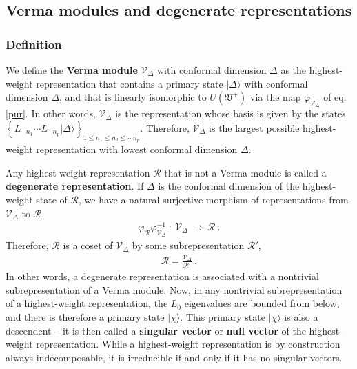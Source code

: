 \documentclass[12pt, a4paper, notitlepage, twoside]{report}
\numberwithin{equation}{section}
\theoremstyle{break}
\begin{document}
\subsection{Verma modules and degenerate representations \label{secvm}}

\subsubsection{Definition}

We define the \textbf{\boldmath Verma module} $\mathcal{V}_\Delta$ with conformal dimension $\Delta$ as the highest-weight representation that contains a primary state $|\Delta\rangle$ with conformal dimension $\Delta$, and that is linearly isomorphic to $U(\mathfrak{V}^+)$ via the map $\varphi_{\mathcal{V}_\Delta}$ of eq. \eqref{pur}.
In other words, $\mathcal{V}_\Delta$ is the representation whose basis is given by the states  $\left\{ L_{-n_1} \cdots L_{-n_p}|\Delta\rangle\right\}_{1\leq n_1\leq n_2\leq \cdots n_p}$.
Therefore, $\mathcal{V}_\Delta$ is the largest possible highest-weight representation with lowest conformal dimension $\Delta$. 

Any  highest-weight representation $\mathcal{R}$ that is not a Verma module is called a \textbf{\boldmath degenerate representation}.
If $\Delta$ is the conformal dimension of the highest-weight state of $\mathcal{R}$, we have a natural surjective morphism of representations from $\mathcal{V}_\Delta$ to $\mathcal{R}$,
\begin{align}
\varphi_\mathcal{R} \varphi_{\mathcal{V}_\Delta}^{-1}\ : \  \mathcal{V}_\Delta\ \rightarrow\ \mathcal{R} \ .
\end{align}
Therefore, $\mathcal{R}$ is a coset of $\mathcal{V}_\Delta$ by some subrepresentation $\mathcal{R}'$,
\begin{align}
 \mathcal{R} = \frac{\mathcal{V}_\Delta}{\mathcal{R}'}\ .
\label{rvrp}
\end{align}
In other words, a degenerate representation is associated with a nontrivial subrepresentation of a Verma module.
Now, in any nontrivial subrepresentation of a highest-weight representation, the $L_0$ eigenvalues are bounded from below, and there is therefore a primary state $|\chi\rangle$.
This primary state $|\chi\rangle$ is also a descendent -- it is then called a \textbf{\boldmath singular vector} or \textbf{\boldmath null vector} of the highest-weight representation.
While a highest-weight representation is by construction always indecomposable, it is irreducible if and only if it has no singular vectors.
\end{document}
